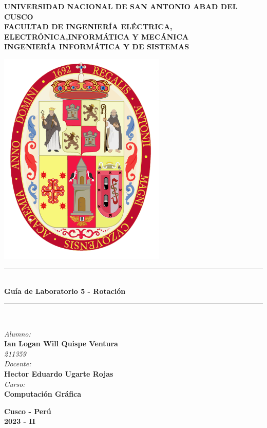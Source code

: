 \documentclass[a4paper]{article}
\begin{document}
\begin{titlepage}

\newcommand{\linea}{\rule{\linewidth}{0.7mm}} 
\center
\textbf{\Large UNIVERSIDAD NACIONAL DE SAN ANTONIO ABAD DEL CUSCO}\\[0.2cm]
\textbf{\Large FACULTAD DE INGENIERÍA ELÉCTRICA, ELECTRÓNICA,INFORMÁTICA Y MECÁNICA}\\[0.2cm]
\textbf{\Large INGENIERÍA INFORMÁTICA Y DE SISTEMAS\\[0.6cm]}

\includegraphics[width=8cm]{src/escudo-unsaac.png}
\vfill

\linea
\\[0.3cm]
\textbf{\LARGE Guía de Laboratorio 5 - Rotación}\\[0.2cm]
\linea \\
\vfill

\textit{\Large Alumno:}\\
    \textbf{\large Ian Logan Will Quispe Ventura}\\
    \textit{211359}\\

\vspace{0.3cm}
    \textit{\Large Docente:}\\
    \textbf{\large Hector Eduardo Ugarte Rojas}\\
\vspace{0.5cm}
    \textit{\Large Curso:}\\
    \textbf{\large Computación Gráfica}\\
    \vfill

\vspace{0.4cm}
    \textbf{\Large Cusco - Perú }\\
    \textbf{\large 2023 - II }\\
    \newpage
    \end{titlepage}
\end{document}
